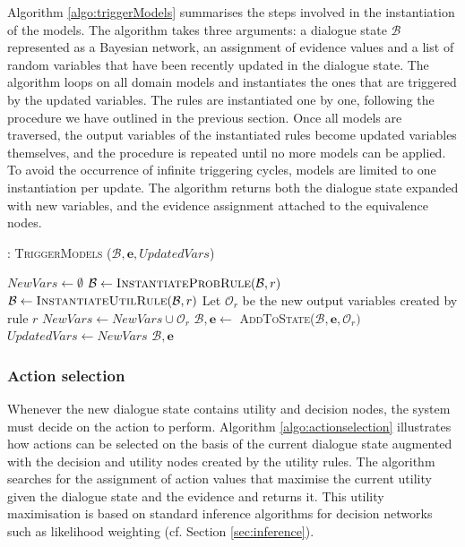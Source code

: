 Algorithm \ref{algo:triggerModels} summarises the steps involved in the instantiation of the models. The algorithm takes three arguments: a dialogue state $\mathcal{B}$ represented as a Bayesian network, an assignment of evidence values and a list of random variables that have been recently updated in the dialogue state. The algorithm loops on all domain models and instantiates the ones that are triggered by the updated variables. The rules are instantiated one by one, following the procedure we have outlined in the previous section. Once all models are traversed, the output variables of the instantiated rules become updated variables themselves, and the procedure is repeated until no more models can be applied.  To avoid the occurrence of infinite triggering cycles, models are limited to one instantiation per update. The algorithm returns both the dialogue state expanded with new variables, and the evidence assignment attached to the equivalence nodes. 


\begin{algorithm}[t]
\caption{: \textsc{TriggerModels} ($\mathcal{B}, \mathbf{e}, \mathit{UpdatedVars}$)}
\begin{algorithmic}[1] \vspace{1mm}
\STATE $\mathit{NewVars} \leftarrow \emptyset$
\STATE $\mathcal{B} \leftarrow \textsc{InstantiateProbRule}(\mathcal{B},r)$
\STATE $\mathcal{B} \leftarrow \textsc{InstantiateUtilRule}(\mathcal{B},r)$
\ENDIF
\STATE Let $\mathcal{O}_r$ be the new output variables created by rule $r$
\STATE $\mathit{NewVars} \leftarrow \mathit{NewVars} \cup \mathcal{O}_r$
\STATE $\mathcal{B}, \mathbf{e} \leftarrow $ \textsc{AddToState}($\mathcal{B}, \mathbf{e}, \mathcal{O}_r)$
\ENDFOR
\ENDIF
\ENDFOR 
\STATE $\mathit{UpdatedVars} \leftarrow \mathit{NewVars}$
\ENDWHILE 
\RETURN $\mathcal{B}, \mathbf{e}$
\end{algorithmic}
\label{algo:triggerModels}
\end{algorithm}


\subsubsection*{Action selection}

Whenever the new dialogue state contains utility and decision nodes, the system must decide on the action to perform.  Algorithm \ref{algo:actionselection} illustrates how actions can be selected on the basis of the current dialogue state augmented with the decision and utility nodes created by the utility rules. The algorithm searches for the assignment of action values that maximise the current utility given the dialogue state and the evidence and returns it. This utility maximisation is based on standard inference algorithms for decision networks such as likelihood weighting (cf. Section \ref{sec:inference}). 

